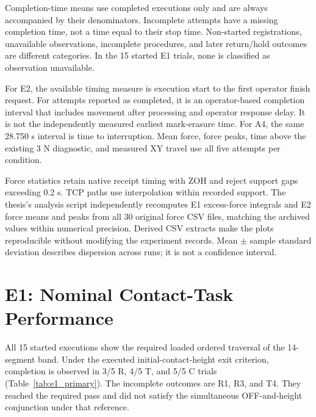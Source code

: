 Completion-time means use completed executions only and are always accompanied by their denominators. Incomplete attempts have a missing completion time, not a time equal to their stop time. Non-started registrations, unavailable observations, incomplete procedures, and later return/hold outcomes are different categories. In the 15 started E1 trials, none is classified as observation unavailable.

For E2, the available timing measure is execution start to the first operator finish request. For attempts reported as completed, it is an operator-based completion interval that includes movement after processing and operator response delay. It is not the independently measured earliest mark-erasure time. For A4, the same 28.750 s interval is time to interruption. Mean force, force peaks, time above the existing 3 N diagnostic, and measured XY travel use all five attempts per condition.

Force statistics retain native receipt timing with ZOH and reject support gaps exceeding 0.2 s. TCP paths use interpolation within recorded support. The thesis's analysis script independently recomputes E1 excess-force integrals and E2 force means and peaks from all 30 original force CSV files, matching the archived values within numerical precision. Derived CSV extracts make the plots reproducible without modifying the experiment records. Mean \(\pm\) sample standard deviation describes dispersion across runs; it is not a confidence interval.

\section{E1: Nominal Contact-Task Performance}
All 15 started executions show the required loaded ordered traversal of the 14-segment band. Under the executed initial-contact-height exit criterion, completion is observed in 3/5 R, 4/5 T, and 5/5 C trials (Table~\ref{tab:e1_primary}). The incomplete outcomes are R1, R3, and T4. They reached the required pass and did not satisfy the simultaneous OFF-and-height conjunction under that reference.

\begin{table}[tbp]\centering\small
\caption[E1 original-criterion results]{E1 nominal development results under the executed original exit criterion. Time is mean \(\pm\) sample SD among completed trials only, with \(n=3,4,5\). Excess-force statistics include all five started executions per method.}
\label{tab:e1_primary}

\end{table}

